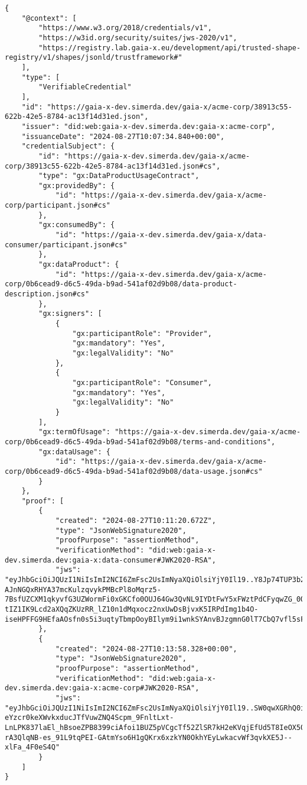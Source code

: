 \begin{verbatim}
{
	"@context": [
		"https://www.w3.org/2018/credentials/v1",
		"https://w3id.org/security/suites/jws-2020/v1",
		"https://registry.lab.gaia-x.eu/development/api/trusted-shape-registry/v1/shapes/jsonld/trustframework#"
	],
	"type": [
		"VerifiableCredential"
	],
	"id": "https://gaia-x-dev.simerda.dev/gaia-x/acme-corp/38913c55-622b-42e5-8784-ac13f14d31ed.json",
	"issuer": "did:web:gaia-x-dev.simerda.dev:gaia-x:acme-corp",
	"issuanceDate": "2024-08-27T10:07:34.840+00:00",
	"credentialSubject": {
		"id": "https://gaia-x-dev.simerda.dev/gaia-x/acme-corp/38913c55-622b-42e5-8784-ac13f14d31ed.json#cs",
		"type": "gx:DataProductUsageContract",
		"gx:providedBy": {
			"id": "https://gaia-x-dev.simerda.dev/gaia-x/acme-corp/participant.json#cs"
		},
		"gx:consumedBy": {
			"id": "https://gaia-x-dev.simerda.dev/gaia-x/data-consumer/participant.json#cs"
		},
		"gx:dataProduct": {
			"id": "https://gaia-x-dev.simerda.dev/gaia-x/acme-corp/0b6cead9-d6c5-49da-b9ad-541af02d9b08/data-product-description.json#cs"
		},
		"gx:signers": [
			{
				"gx:participantRole": "Provider",
				"gx:mandatory": "Yes",
				"gx:legalValidity": "No"
			},
			{
				"gx:participantRole": "Consumer",
				"gx:mandatory": "Yes",
				"gx:legalValidity": "No"
			}
		],
		"gx:termOfUsage": "https://gaia-x-dev.simerda.dev/gaia-x/acme-corp/0b6cead9-d6c5-49da-b9ad-541af02d9b08/terms-and-conditions",
		"gx:dataUsage": {
			"id": "https://gaia-x-dev.simerda.dev/gaia-x/acme-corp/0b6cead9-d6c5-49da-b9ad-541af02d9b08/data-usage.json#cs"
		}
	},
	"proof": [
		{
			"created": "2024-08-27T10:11:20.672Z",
			"type": "JsonWebSignature2020",
			"proofPurpose": "assertionMethod",
			"verificationMethod": "did:web:gaia-x-dev.simerda.dev:gaia-x:data-consumer#JWK2020-RSA",
			"jws": "eyJhbGciOiJQUzI1NiIsImI2NCI6ZmFsc2UsImNyaXQiOlsiYjY0Il19..Y8Jp74TUP3b2kvLmrszODY-AJnNGQxRHYA37mcKulzqvykPMBcPl8oMqrz5-7BsfUZCXM1qkyvfG3UZWormFi0xGKCfo0OUJ64Gw3QvNL9IYDtFwY5xFWztPdCFyqwZG_0Oxtt6a-tIZ1IK9Lcd2aXQqZKUzRR_lZ10n1dMqxocz2nxUwDsBjvxK5IRPdImg1b4O-iseHPFFG9HEfaAOsfn0s5i3uqtyTbmpOoyBIlym9i1wnkSYAnvBJzgmnG0lT7CbQ7vfl5sFDfvVN9b6zu09tNH68wItAc5iDQifIvb0us8uROTp4vcjytQqjlfEbokvKjINKLd8RGAMBw4cAA"
		},
		{
			"created": "2024-08-27T10:13:58.328+00:00",
			"type": "JsonWebSignature2020",
			"proofPurpose": "assertionMethod",
			"verificationMethod": "did:web:gaia-x-dev.simerda.dev:gaia-x:acme-corp#JWK2020-RSA",
			"jws": "eyJhbGciOiJQUzI1NiIsImI2NCI6ZmFsc2UsImNyaXQiOlsiYjY0Il19..SW0qwXGRhQ0iCc5iG3vZvJn5k3Wdqf9i1w1uENAsGhr0tpICcmdM4G4FzOIv8V4NUcF4hGvE7p3z3sKAJds-eYzcr0keXWvkxducJTfVuwZNQ4Scpm_9FnltLxt-LnLPK837laEl_hBsoeZPB8399ciAfoi1BUZ5pVCgcTf52ZlSR7kH2eKVqjEfUd5T8IeOX50qYRiqaPlkHtUahxxH6pakTiBnTxCdbaCHVOB15bcJLvJG7J3bKGP8iQyC5GycAWeI9-rA3QlqNB-es_91L9tqPEI-GAtmYso6H1gQKrx6xzkYN0OkhYEyLwkacvWf3qvkXE5J--xlFa_4F0eS4Q"
		}
	]
}
\end{verbatim}
